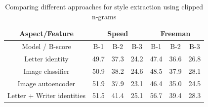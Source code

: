\begin{table}[!htbp]
\centering
\begin{tabular}{|c||c|c|c||c|c|c|}
\hline
\multicolumn{1}{|c||}{Aspect/Feature} & \multicolumn{3}{c||}{ Speed } & \multicolumn{3}{c|}{ Freeman }   \\
\hline
Model / B-score      & B-1  & B-2  & B-3           & B-1  & B-2   & B-3              \\ \hline
Letter identity          & 49.7 & 37.3 & 24.2          & 47.4 & 36.6  & 26.8               \\\hline
Image classifier     & 50.9 & 38.2 & 24.6          & 48.5 & 37.9 & 28.1             \\\hline
Image autoencoder    & 51.9 & 37.9 & 23.1          & 46.4 & 35.0  & 24.5             \\\hline
Letter + Writer identities & 51.5 & 41.4 & 25.1          & 56.7 & 39.4  & 28.3             \\\hline
\end{tabular}
\caption{Comparing different approaches for style extraction using clipped n-grams}
\label{table:1}
\end{table}

